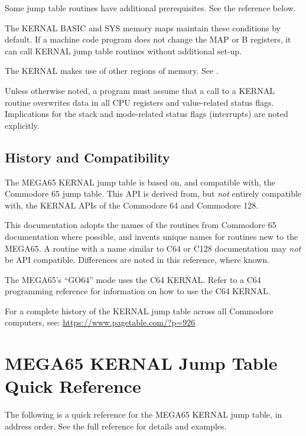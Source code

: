 Some jump table routines have additional prerequisites. See the reference below.

The KERNAL BASIC and SYS memory maps maintain these conditions by default. If a machine code program does not change the MAP or B registers, it can call KERNAL jump table routines without additional set-up.

The KERNAL makes use of other regions of memory. See .

Unless otherwise noted, a program must assume that a call to a KERNAL routine overwrites data in all CPU registers and value-related status flags. Implications for the stack and mode-related status flags (interrupts) are noted explicitly.

\subsection{History and Compatibility}

The MEGA65 KERNAL jump table is based on, and compatible with, the Commodore 65 jump table. This API is derived from, but \emph{not} entirely compatible with, the KERNAL APIs of the Commodore 64 and Commodore 128.

This documentation adopts the names of the routines from Commodore 65 documentation where possible, and invents unique names for routines new to the MEGA65. A routine with a name similar to C64 or C128 documentation may \emph{not} be API compatible. Differences are noted in this reference, where known.

The MEGA65's ``GO64'' mode uses the C64 KERNAL. Refer to a C64 programming reference for information on how to use the C64 KERNAL.

For a complete history of the KERNAL jump table across all Commodore computers, see: \url{https://www.pagetable.com/?p=926}

\newpage
\section{MEGA65 KERNAL Jump Table Quick Reference}

The following is a quick reference for the MEGA65 KERNAL jump table, in address order. See the full reference for details and examples.

